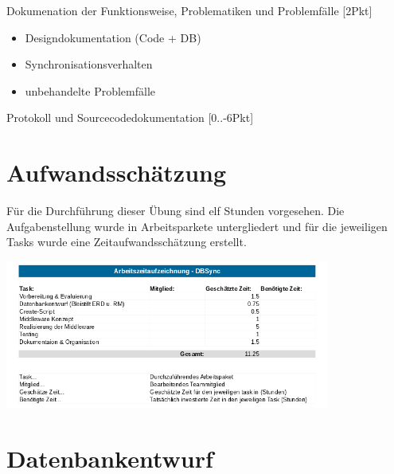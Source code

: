 \documentclass[a4paper]{article}
\begin{document}
	Dokumenation der Funktionsweise, Problematiken und Problemfälle [2Pkt]
	\begin{itemize}
		\item Designdokumentation (Code + DB)
		\item Synchronisationsverhalten
		\item unbehandelte Problemfälle\\
	\end{itemize}
	
	Protokoll und Sourcecodedokumentation [0..-6Pkt]
	
	\newpage
	\section{Aufwandsschätzung}
	Für die Durchführung dieser Übung sind elf Stunden vorgesehen.
	Die Aufgabenstellung wurde in Arbeitsparkete untergliedert und für die jeweiligen Tasks wurde eine Zeitaufwandsschätzung erstellt.\\
	\begin{center}
		\includegraphics[width=0.8\textwidth]{img/timetable.png}
	\end{center}
	
	\newpage
	\section{Datenbankentwurf}
\end{document}
